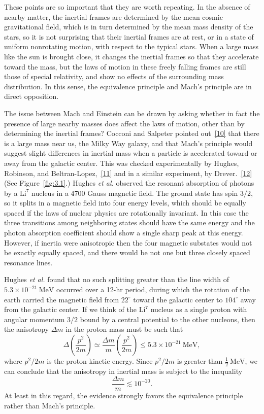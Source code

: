 These points are so important that they are worth repeating. In the absence
of nearby matter, the inertial frames are determined by the mean cosmic
gravitational field, which is in turn determined by the mean mass density of
the stars, so it is not surprising that their inertial frames are at rest, or
in a state of uniform nonrotating motion, with respect to the typical stars.
When a large mass like the sun is brought close, it changes the inertial
frames so that they accelerate toward the mass, but the laws of motion in
these freely falling frames are still those of special relativity, and show
no effects of the surrounding mass distribution. In this sense, the
equivalence principle and Mach's principle are in direct opposition.

The issue between Mach and Einstein can be drawn by asking whether in fact
the presence of large nearby masses does affect the laws of motion, other
than by determining the inertial frames? Cocconi and Salpeter pointed
out~\hyperref[ch3-ref-10]{[10]} that there is a large mass near us, the Milky
Way galaxy, and that Mach's principle would suggest slight differences in
inertial mass when a particle is accelerated toward or away from the
galactic center. This was checked experimentally by Hughes, Robinson, and
Beltran-Lopez,~\hyperref[ch3-ref-11]{[11]} and in a similar experiment, by
Drever.~\hyperref[ch3-ref-12]{[12]} (See Figure~\ref{fig:3.1}.) Hughes
\emph{et al.} observed the resonant absorption of photons by a
$\mathrm{Li}^{7}$ nucleus in a 4700 Gauss magnetic field. The ground state
has spin $3/2$, so it splits in a magnetic field into four energy levels,
which should be equally spaced if the laws of nuclear physics are
rotationally invariant. In this case the three transitions among neighboring
states should have the same energy and the photon absorption coefficient
should show a single sharp peak at this energy. However, if inertia were
anisotropic then the four magnetic substates would not be exactly equally
spaced, and there would be not one but three closely spaced resonance lines.



Hughes \emph{et al.} found that no such splitting greater than the line width
of $5.3\times10^{-21}\ \mathrm{MeV}$ occurred over a 12-hr period, during
which the rotation of the earth carried the magnetic field from
$22^\circ$ toward the galactic center to $104^\circ$ away from the galactic
center. If we think of the $\mathrm{Li}^{7}$ nucleus as a single proton with
angular momentum $3/2$ bound by a central potential to the other nucleons,
then the anisotropy $\Delta m$ in the proton mass must be such that
\[
  \Delta\left(\frac{p^2}{2m}\right)
  \simeq\frac{\Delta m}{m}\left(\frac{p^2}{2m}\right)
  \leq5.3\times10^{-21}\ \mathrm{MeV},
\]
where $p^2/2m$ is the proton kinetic energy. Since $p^2/2m$ is greater than
$\tfrac12\ \mathrm{MeV}$, we can conclude that the anisotropy in inertial
mass is subject to the inequality
\[
  \frac{\Delta m}{m}\lesssim10^{-20}.
\]
At least in this regard, the evidence strongly favors the equivalence
principle rather than Mach's principle.
